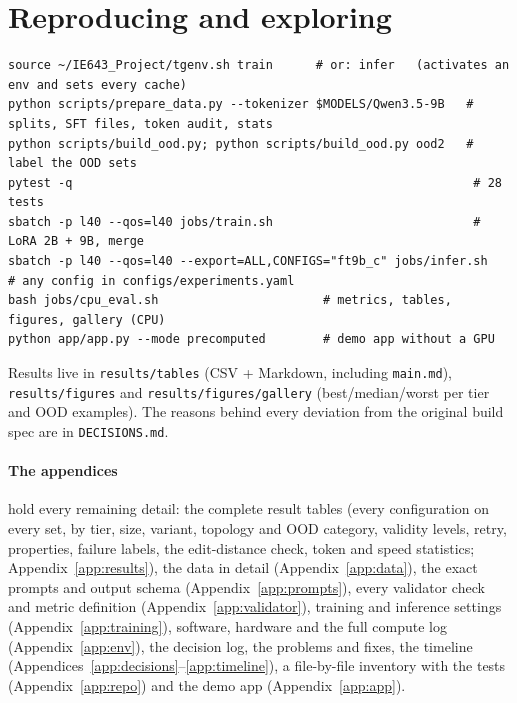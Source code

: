 \documentclass[11pt,a4paper]{article}
\begin{document}
\section{Reproducing and exploring}\label{sec:repro}
\begin{lstlisting}[style=plain]
source ~/IE643_Project/tgenv.sh train      # or: infer   (activates an env and sets every cache)
python scripts/prepare_data.py --tokenizer $MODELS/Qwen3.5-9B   # splits, SFT files, token audit, stats
python scripts/build_ood.py; python scripts/build_ood.py ood2   # label the OOD sets
pytest -q                                                        # 28 tests
sbatch -p l40 --qos=l40 jobs/train.sh                            # LoRA 2B + 9B, merge
sbatch -p l40 --qos=l40 --export=ALL,CONFIGS="ft9b_c" jobs/infer.sh   # any config in configs/experiments.yaml
bash jobs/cpu_eval.sh                       # metrics, tables, figures, gallery (CPU)
python app/app.py --mode precomputed        # demo app without a GPU
\end{lstlisting}
Results live in \texttt{results/tables} (CSV + Markdown, including \texttt{main.md}), \texttt{results/figures} and
\texttt{results/figures/gallery} (best/median/worst per tier and OOD examples). The reasons behind every deviation from
the original build spec are in \texttt{DECISIONS.md}.

\paragraph{The appendices} hold every remaining detail: the complete result tables (every configuration on every
set, by tier, size, variant, topology and OOD category, validity levels, retry, properties, failure labels, the
edit-distance check, token and speed statistics; Appendix~\ref{app:results}), the data in detail
(Appendix~\ref{app:data}), the exact prompts and output schema (Appendix~\ref{app:prompts}), every validator check and
metric definition (Appendix~\ref{app:validator}), training and inference settings (Appendix~\ref{app:training}),
software, hardware and the full compute log (Appendix~\ref{app:env}), the decision log, the problems and fixes, the
timeline (Appendices~\ref{app:decisions}--\ref{app:timeline}), a file-by-file inventory with the tests
(Appendix~\ref{app:repo}) and the demo app (Appendix~\ref{app:app}).

\appendix
\end{document}
